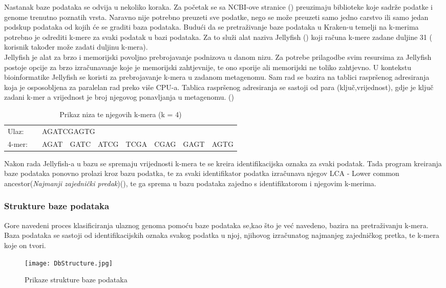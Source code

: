 \documentclass[times, utf8, zavrsni]{fer}
\begin{document}
Nastanak baze podataka se odvija u nekoliko koraka. Za početak se sa NCBI-ove stranice (\cite{NCBI}) preuzimaju biblioteke koje sadrže podatke i genome trenutno poznatih vrsta. Naravno nije potrebno preuzeti sve podatke, nego se može preuzeti samo jedno carstvo ili samo jedan podskup podataka od kojih će se graditi baza podataka. Budući da se pretraživanje baze podataka u Kraken-u temelji na k-merima potrebno je odrediti k-mere za svaki podatak u bazi podataka. Za to služi alat naziva Jellyfish (\cite{jellyfish}) koji računa k-mere zadane duljine 31 ( korisnik također može zadati duljinu k-mera).\\Jellyfish je alat za brzo i memorijski povoljno prebrojavanje podnizova u danom nizu. Za potrebe prilagodbe svim resursima za Jellyfish postoje opcije za brzo izračunavanje koje je memorijski zahtjevnije, te ono sporije ali memorijski ne toliko zahtjevno. U kontekstu bioinformatike Jellyfish se koristi za prebrojavanje k-mera u zadanom metagenomu. Sam rad se bazira na tablici raspršenog adresiranja koja je osposobljena za paralelan rad preko više CPU-a. Tablica raspršenog adresiranja se sastoji od para (ključ,vrijednost), gdje je ključ zadani k-mer a vrijednost je broj njegovog ponavljanja u metagenomu. (\cite{jellyfish})
	 	
\begin{table}[hbp]
	\centering
	\caption{Prikaz niza te njegovih k-mera (k = 4)}
	\label{Prikaz k-mera}
	\begin{tabular}{llllllllll}
		Ulaz:  &           & \multicolumn{8}{l}{AGATCGAGTG}                            \\
		4-mer: & \multicolumn{2}{l}{} & AGAT & GATC & ATCG & TCGA & CGAG & GAGT & AGTG
	\end{tabular}
\end{table}
Nakon rada Jellyfish-a u bazu se spremaju vrijednosti k-mera te se kreira identifikacijska oznaka za svaki podatak. Tada program kreiranja baze podataka ponovno prolazi kroz bazu podatka, te za svaki identifikator podatka izračunava njegov LCA - Lower common ancestor(\textit{Najmanji zajednički predak})(\cite{lca1,lca2,lca3}), te ga sprema u bazu podataka zajedno s identifikatorom i njegovim k-merima.
\subsubsection{Strukture baze podataka}
Gore navedeni proces klasificiranja ulaznog genoma pomoću baze podataka se,kao što je već navedeno, bazira na pretraživanju k-mera. Baza podataka se sastoji od identifikacijskih oznaka svakog podatka u njoj, njihovog izračunatog najmanjeg zajedničkog pretka, te k-mera koje on tvori.\\
\begin{figure}[hbp]
	\centering
	\texttt{[image: DbStructure.jpg]}
	\caption{Prikaze strukture baze podataka}
	\label{BazaPodataka}
\end{figure}
\end{document}
